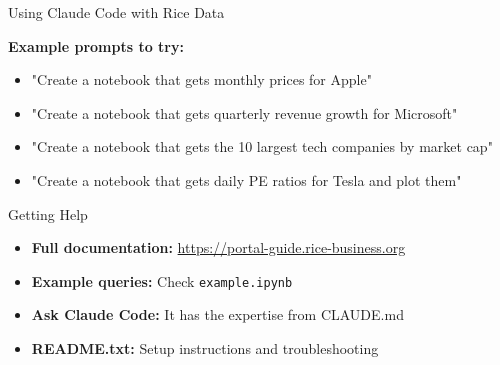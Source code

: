 \documentclass[aspectratio=169]{beamer}
\begin{document}
\begin{frame}[fragile]{Using Claude Code with Rice Data}

\textbf{Example prompts to try:}

\begin{itemize}
    \item "Create a notebook that gets monthly prices for Apple"
    \item "Create a notebook that gets quarterly revenue growth for Microsoft"
    \item "Create a notebook that gets the 10 largest tech companies by market cap"
    \item "Create a notebook that gets daily PE ratios for Tesla and plot them"
\end{itemize}

\end{frame}



\begin{frame}{Getting Help}

\begin{itemize}
    \item \textbf{Full documentation:} \url{https://portal-guide.rice-business.org}
    \item \textbf{Example queries:} Check \texttt{example.ipynb}
    \item \textbf{Ask Claude Code:} It has the expertise from CLAUDE.md
    \item \textbf{README.txt:} Setup instructions and troubleshooting
\end{itemize}

\end{frame}
\end{document}
